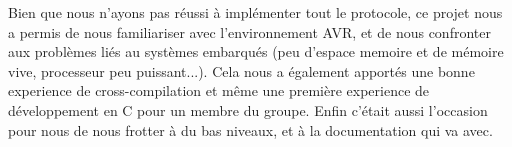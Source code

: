 Bien que nous n'ayons pas réussi à implémenter tout le protocole, ce projet nous a permis de nous familiariser avec l'environnement AVR, et de nous confronter aux problèmes liés au systèmes embarqués (peu d'espace memoire et de mémoire vive, processeur peu puissant...). Cela nous a également apportés une bonne experience de cross-compilation et même une première experience de développement en C pour un membre du groupe. Enfin c'était aussi l'occasion pour nous de nous frotter à du bas niveaux, et à la documentation qui va avec.   
